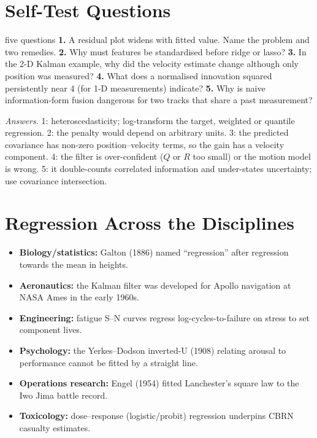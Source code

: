 \documentclass[11pt]{article}
\begin{document}
\section{Self-Test Questions}
\begin{question}{five questions}
\textbf{1.} A residual plot widens with fitted value. Name the problem and two remedies. \textbf{2.} Why must features be standardised before ridge or lasso? \textbf{3.} In the 2-D Kalman example, why did the velocity estimate change although only position was measured? \textbf{4.} What does a normalised innovation squared persistently near 4 (for 1-D measurements) indicate? \textbf{5.} Why is naive information-form fusion dangerous for two tracks that share a past measurement?

\textit{Answers.} 1: heteroscedasticity; log-transform the target, weighted or quantile regression. 2: the penalty would depend on arbitrary units. 3: the predicted covariance has non-zero position--velocity terms, so the gain has a velocity component. 4: the filter is over-confident ($Q$ or $R$ too small) or the motion model is wrong. 5: it double-counts correlated information and under-states uncertainty; use covariance intersection.
\end{question}

\section{Regression Across the Disciplines}
\begin{itemize}
\item \textbf{Biology/statistics:} Galton (1886) named ``regression'' after regression towards the mean in heights.
\item \textbf{Aeronautics:} the Kalman filter was developed for Apollo navigation at NASA Ames in the early 1960s.
\item \textbf{Engineering:} fatigue S--N curves regress log-cycles-to-failure on stress to set component lives.
\item \textbf{Psychology:} the Yerkes--Dodson inverted-U (1908) relating arousal to performance cannot be fitted by a straight line.
\item \textbf{Operations research:} Engel (1954) fitted Lanchester's square law to the Iwo Jima battle record.
\item \textbf{Toxicology:} dose--response (logistic/probit) regression underpins CBRN casualty estimates.
\end{itemize}
\end{document}
